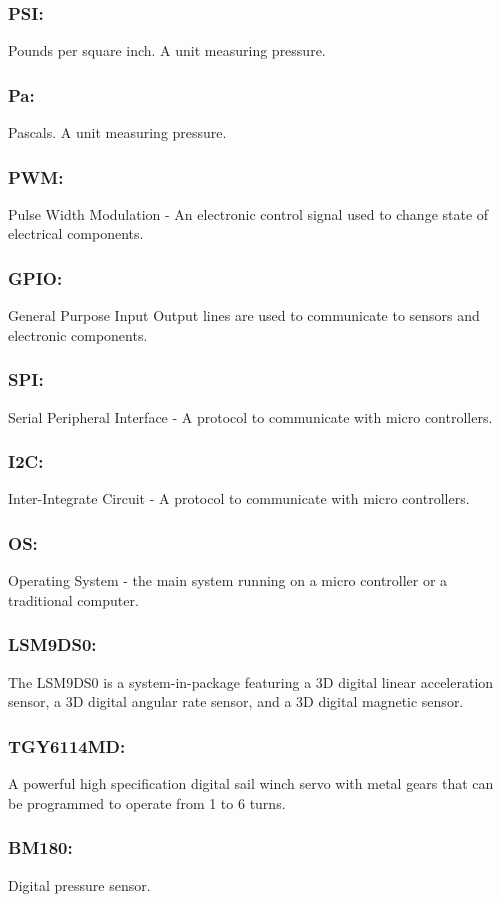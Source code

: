 \documentclass[10pt,draftclsnofoot,onecolumn,compsoc]{IEEEtran}
\begin{document}
\subsubsection{\bf PSI:}Pounds per square inch. A unit measuring pressure. 
\subsubsection{\bf Pa:} Pascals. A unit measuring pressure.
\subsubsection{\bf PWM:} Pulse Width Modulation - An electronic control signal used to change state of electrical components.
\subsubsection{\bf GPIO:}  General Purpose Input Output lines are used to communicate to sensors and electronic components.
\subsubsection{\bf SPI:}  Serial Peripheral Interface - A protocol to communicate with micro controllers.
\subsubsection{\bf I2C:}  Inter-Integrate Circuit - A protocol to communicate with micro controllers.
\subsubsection{\bf OS:} Operating System - the main system running on a micro controller or a traditional computer.
\subsubsection{\bf LSM9DS0:} The LSM9DS0 is a system-in-package featuring a 3D digital linear acceleration sensor,  a 3D digital angular rate sensor, and a 3D digital magnetic sensor.
\subsubsection{\bf TGY6114MD:}A powerful high specification digital sail winch servo with metal gears that can be programmed to operate from 1 to 6 turns.
\subsubsection{\bf BM180:}Digital pressure sensor.
\end{document}
